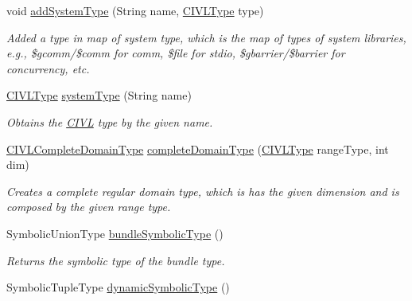\begin{DoxyCompactItemize}
void \hyperlink{classedu_1_1udel_1_1cis_1_1vsl_1_1civl_1_1model_1_1common_1_1CommonCIVLTypeFactory_a787c17d0e4633cab538d160b950a2818}{add\+System\+Type} (String name, \hyperlink{interfaceedu_1_1udel_1_1cis_1_1vsl_1_1civl_1_1model_1_1IF_1_1type_1_1CIVLType}{C\+I\+V\+L\+Type} type)
\begin{DoxyCompactList}\small\item\em Added a type in map of system type, which is the map of types of system libraries, e.\+g., \$gcomm/\$comm for comm, \$file for stdio, \$gbarrier/\$barrier for concurrency, etc. \end{DoxyCompactList}\item 
\hyperlink{interfaceedu_1_1udel_1_1cis_1_1vsl_1_1civl_1_1model_1_1IF_1_1type_1_1CIVLType}{C\+I\+V\+L\+Type} \hyperlink{classedu_1_1udel_1_1cis_1_1vsl_1_1civl_1_1model_1_1common_1_1CommonCIVLTypeFactory_a6dee7957b5032dd3ed5f15b9b6089d9b}{system\+Type} (String name)
\begin{DoxyCompactList}\small\item\em Obtains the \hyperlink{classedu_1_1udel_1_1cis_1_1vsl_1_1civl_1_1CIVL}{C\+I\+V\+L} type by the given name. \end{DoxyCompactList}\item 
\hyperlink{interfaceedu_1_1udel_1_1cis_1_1vsl_1_1civl_1_1model_1_1IF_1_1type_1_1CIVLCompleteDomainType}{C\+I\+V\+L\+Complete\+Domain\+Type} \hyperlink{classedu_1_1udel_1_1cis_1_1vsl_1_1civl_1_1model_1_1common_1_1CommonCIVLTypeFactory_a4bcc6810e791715c353d42b4400cbe03}{complete\+Domain\+Type} (\hyperlink{interfaceedu_1_1udel_1_1cis_1_1vsl_1_1civl_1_1model_1_1IF_1_1type_1_1CIVLType}{C\+I\+V\+L\+Type} range\+Type, int dim)
\begin{DoxyCompactList}\small\item\em Creates a complete regular domain type, which is has the given dimension and is composed by the given range type. \end{DoxyCompactList}\item 
Symbolic\+Union\+Type \hyperlink{classedu_1_1udel_1_1cis_1_1vsl_1_1civl_1_1model_1_1common_1_1CommonCIVLTypeFactory_af22a4cdefdefc62e2d791d37e8979025}{bundle\+Symbolic\+Type} ()
\begin{DoxyCompactList}\small\item\em Returns the symbolic type of the bundle type. \end{DoxyCompactList}\item 
Symbolic\+Tuple\+Type \hyperlink{classedu_1_1udel_1_1cis_1_1vsl_1_1civl_1_1model_1_1common_1_1CommonCIVLTypeFactory_ad2801063395edccb9771c83a0dcdcf6d}{dynamic\+Symbolic\+Type} ()

\end{DoxyCompactItemize}
